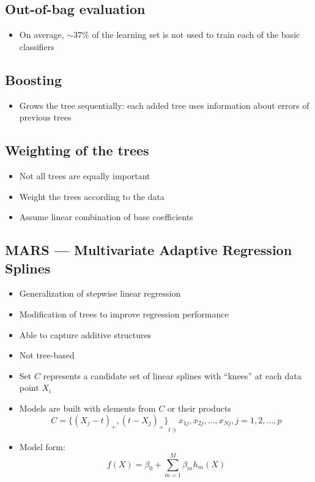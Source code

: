 \documentclass{article}
\begin{document}
        \subsection{Out-of-bag evaluation}
        \begin{itemize}
            \item On average, $\sim 37\%$ of the learning set is not used to train each of the basic classifiers
        \end{itemize}

        \subsection{Boosting}
        \begin{itemize}
            \item Grows the tree sequentially: each added tree uses information about errors of previous trees
        \end{itemize}

        \subsection{Weighting of the trees}
        \begin{itemize}
            \item Not all trees are equally important
            \item Weight the trees according to the data
            \item Assume linear combination of base coefficients
        \end{itemize}

        \subsection{MARS --- Multivariate Adaptive Regression Splines}
        \begin{itemize}
            \item Generalization of stepwise linear regression
            \item Modification of trees to improve regression performance
            \item Able to capture additive structures
            \item Not tree-based
            \item Set $C$ represents a candidate set of linear splines with ``knees'' at each data point $X_i$
            \item Models are built with elements from $C$ or their products
            \[ C = {\{{(X_j - t)}_+, {(t - X_j)}_+ \}}_{t \ni} x_{1j}, x_{2j}, \ldots, x_{Nj}, j = 1, 2, \ldots, p \]
            \item Model form:
            \[ f(X) = \beta_0 + \sum_{m=1}^{M} \beta_m h_m(X) \]
        \end{itemize}
\end{document}
